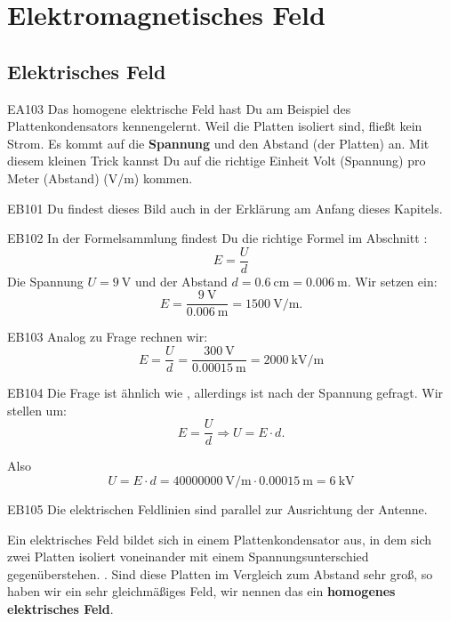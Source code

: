 \setcounter{section}{3}
\section{Elektromagnetisches Feld}
\subsection{Elektrisches Feld}

\begin{sol}{EA103}
  Das homogene elektrische Feld hast Du am Beispiel des Plattenkondensators kennengelernt. Weil die Platten isoliert sind, fließt kein Strom. Es kommt auf die \textbf{Spannung} und den Abstand (der Platten) an.
  Mit diesem kleinen Trick kannst Du auf die richtige Einheit Volt (Spannung) pro Meter (Abstand) (V/m) kommen.
\end{sol}

\begin{sol}{EB101}
  Du findest dieses Bild auch in der Erklärung am Anfang dieses Kapitels.
\end{sol}

\begin{sol}{EB102}
In der Formelsammlung findest Du die richtige Formel im Abschnitt :
$$ E = \frac{U}{d}$$
Die Spannung $U=\SI{9}{\volt}$ und der Abstand $d=\SI{0.6}{\centi\meter} = \SI{0.006}{\meter}$. Wir setzen ein:
$$E=\frac{\SI{9}{\volt}}{\SI{0.006}{\meter}} = \SI{1500}{\volt\per\metre}.
$$
\end{sol}


\begin{sol}{EB103}
  Analog zu Frage  rechnen wir:
  $$E = \frac{U}{d} = \frac{\SI{300}{\volt}}{\SI{0.00015}{\meter}} = \SI{2000}{\kilo\volt\per\meter}$$
\end{sol}

\begin{sol}{EB104}
Die Frage ist ähnlich wie , allerdings ist nach der Spannung gefragt. Wir stellen um: $$E = \frac{U}{d}  \Rightarrow U = E \cdot d .$$

Also
$$ U = E \cdot d = \SI{40000000}{\volt\per\meter } \cdot \SI{0.00015}{\meter} = \SI{6}{\kilo\volt}$$
\end{sol}

\begin{sol}{EB105}
  Die elektrischen Feldlinien sind parallel zur Ausrichtung der Antenne. 
\end{sol}


\begin{ohmchapter}
  Ein elektrisches Feld bildet sich in einem Plattenkondensator aus, in dem sich zwei Platten isoliert voneinander mit einem Spannungsunterschied gegenüberstehen.
  .
  Sind diese Platten im Vergleich zum Abstand sehr groß, so haben wir ein sehr gleichmäßiges Feld, wir nennen das ein \textbf{homogenes elektrisches Feld}.
\end{ohmchapter}    

